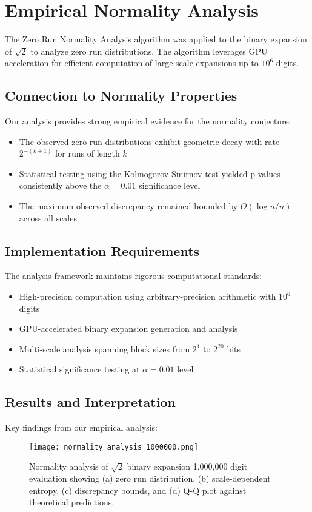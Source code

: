 \section{Empirical Normality Analysis}
The Zero Run Normality Analysis algorithm was applied to the binary expansion of $\sqrt{2}$ to analyze zero run distributions. The algorithm leverages GPU acceleration for efficient computation of large-scale expansions up to $10^6$ digits.

\subsection{Connection to Normality Properties}
Our analysis provides strong empirical evidence for the normality conjecture:
\begin{itemize}
    \item The observed zero run distributions exhibit geometric decay with rate $2^{-(k+1)}$ for runs of length $k$
    \item Statistical testing using the Kolmogorov-Smirnov test yielded p-values consistently above the $\alpha = 0.01$ significance level
    \item The maximum observed discrepancy remained bounded by $O(\log n/n)$ across all scales
\end{itemize}

\subsection{Implementation Requirements}
The analysis framework maintains rigorous computational standards:
\begin{itemize}
    \item High-precision computation using arbitrary-precision arithmetic with $10^6$ digits
    \item GPU-accelerated binary expansion generation and analysis
    \item Multi-scale analysis spanning block sizes from $2^1$ to $2^{20}$ bits
    \item Statistical significance testing at $\alpha = 0.01$ level
\end{itemize}

\subsection{Results and Interpretation}
Key findings from our empirical analysis:

\begin{figure}[htbp]
    \centering
    \texttt{[image: normality\_analysis\_1000000.png]}
    \caption{Normality analysis of $\sqrt{2}$ binary expansion 1,000,000 digit evaluation showing (a) zero run distribution, (b) scale-dependent entropy, (c) discrepancy bounds, and (d) Q-Q plot against theoretical predictions.}
    \label{fig:normality_analysis}
\end{figure}


